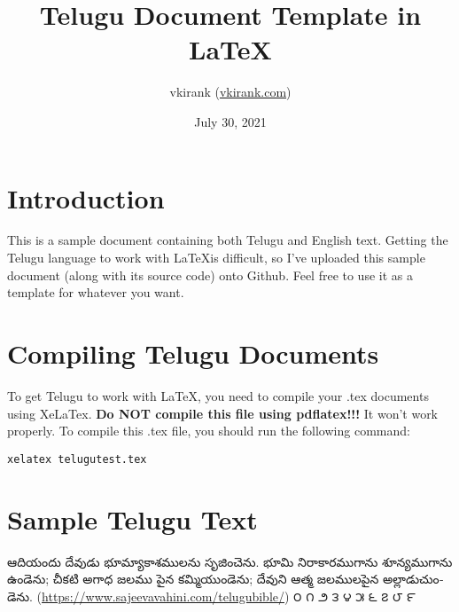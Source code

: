 \documentclass{article}
\title{Telugu Document Template in \LaTeX}
\author{vkirank (\url{vkirank.com})}
\date{July 30, 2021}
\begin{document}
\maketitle
\section{Introduction}
This is a sample document containing both Telugu and English text.
Getting the Telugu language to work with \LaTeX is difficult, so I've uploaded this sample document (along with its source code) onto Github.
Feel free to use it as a template for whatever you want.
\section{Compiling Telugu Documents}
To get Telugu to work with \LaTeX, you need to compile your .tex documents using XeLaTex.
\textbf{Do NOT compile this file using pdflatex!!!} It won't work properly.
To compile this .tex file, you should run the following command:
\begin{verbatim}
xelatex telugutest.tex
\end{verbatim}
\section{Sample Telugu Text}
\begin{telugu}
ఆదియందు దేవుడు భూమ్యాకాశములను సృజించెను.
భూమి నిరాకారముగాను శూన్యముగాను ఉండెను; చీకటి అగాధ జలము పైన కమ్మియుండెను; దేవుని ఆత్మ జలములపైన అల్లాడుచుండెను.
(\url{https://www.sajeevavahini.com/telugubible/})
\linebreak
౦ ౧ ౨ ౩ ౪ ౫ ౬ ౭ ౮ ౯
\end{telugu}
\end{document}
